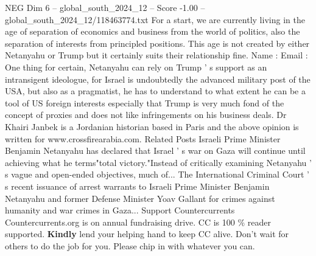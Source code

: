 \begin{textsample}{NEG Dim 6 – global\_south\_2024\_12 – Score -1.00 – global\_south\_2024\_12/118463774.txt}
For a start, we are currently living in the age of separation of economics and business from the world of politics, also the separation of interests from principled positions.
This age is not created by either Netanyahu or Trump but it certainly suits their relationship fine.
Name : Email : One thing for certain, Netanyahu can rely on Trump ' s support as an intransigent ideologue, for Israel is undoubtedly the advanced military post of the USA, but also as a pragmatist, he has to understand to what extent he can be a tool of US foreign interests especially that Trump is very much fond of the concept of proxies and does not like infringements on his business deals.
Dr Khairi Janbek is a Jordanian historian based in Paris and the above opinion is written for www.crossfirearabia.com.
Related Posts Israeli Prime Minister Benjamin Netanyahu has declared that Israel ' s war on Gaza will continue until achieving what he terms"total victory."Instead of critically examining Netanyahu ' s vague and open-ended objectives, much of...
The International Criminal Court ' s recent issuance of arrest warrants to Israeli Prime Minister Benjamin Netanyahu and former Defense Minister Yoav Gallant for crimes against humanity and war crimes in Gaza...
Support Countercurrents Countercurrents.org is on annual fundraising drive.
CC is 100 \% reader supported. \textbf{Kindly} lend your helping hand to keep CC alive.
Don't wait for others to do the job for you.
Please chip in with whatever you can.

\end{textsample}
